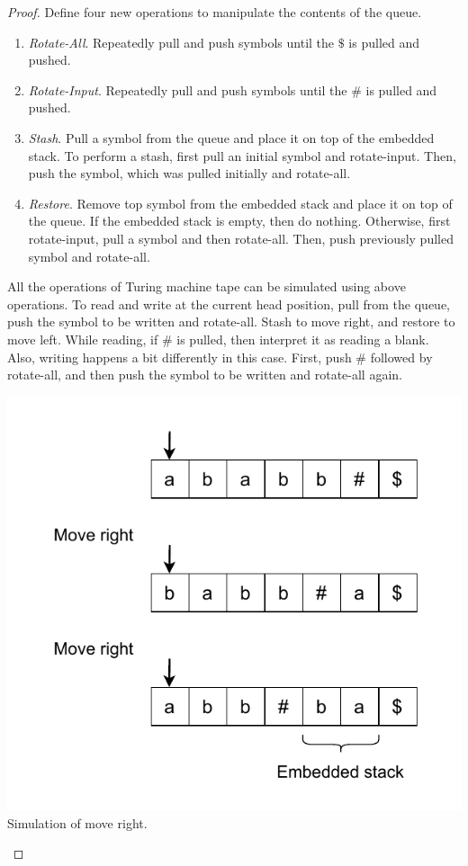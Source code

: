 \documentclass[11pt]{article}
\begin{document}
\begin{proof}
Define four new operations to manipulate the contents of the queue.
\begin{enumerate}
\item \textit{Rotate-All}. Repeatedly pull and push symbols until the $\$$ is pulled and pushed.
\item \textit{Rotate-Input}. Repeatedly pull and push symbols until the $\#$ is pulled and pushed.
\item \textit{Stash}. Pull a symbol from the queue and place it on top of the embedded stack. To perform a stash, first pull an initial symbol and rotate-input. Then, push the symbol, which was pulled initially and rotate-all.
\item \textit{Restore}. Remove top symbol from the embedded stack and place it on top of the queue. If the embedded stack is empty, then do nothing. Otherwise, first rotate-input, pull a symbol and then rotate-all. Then, push previously pulled symbol and rotate-all.
\end{enumerate}

All the operations of Turing machine tape can be simulated using above operations. To read and write at the current head position, pull from the queue, push the symbol to be written and rotate-all. Stash to move right, and restore to move left. While reading, if $\#$ is pulled, then interpret it as reading a blank. Also, writing happens a bit differently in this case. First, push $\#$ followed by rotate-all, and then push the symbol to be written and rotate-all again.




\begin{center}
\includegraphics[scale=0.8]{Figures/Problem3.14b.pdf} \\
Simulation of move right.
\end{center}
\end{proof}
\end{document}
